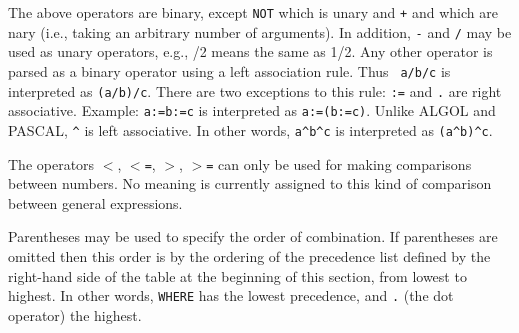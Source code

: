 The above operators are binary, except {\tt NOT} which is
unary and {\tt +} and {\tt *} which are nary (i.e., taking an arbitrary
number of arguments).  In addition, {\tt -} and {\tt /} may be used as
unary operators, e.g., /2 means the same as 1/2.  Any other operator is
parsed as a binary operator using a left association rule.  Thus {\tt
a/b/c} is interpreted as {\tt (a/b)/c}.  There are two exceptions to this
rule: {\tt :=} and {\tt .} are right associative.  Example: {\tt a:=b:=c}
is interpreted as {\tt a:=(b:=c)}.  Unlike ALGOL and PASCAL, {\tt \verb|^|} is
left associative.  In other words, {\tt a\verb|^|b\verb|^|c} is interpreted as
{\tt (a\verb|^|b)\verb|^|c}.

The operators {\tt $<$}, {\tt $<$=}, {\tt $>$}, {\tt $>$=}
can only be used for making comparisons between numbers.  No meaning is
currently assigned to this kind of comparison between general expressions.

Parentheses may be used to specify the order of combination.  If
parentheses are omitted then this order is by the ordering of the
precedence list defined by the right-hand side
of the {\tt <infix operator>} table
at the beginning of this section,
from lowest to highest.  In other words, {\tt WHERE} has the lowest
precedence, and {\tt .} (the dot operator) the highest.

